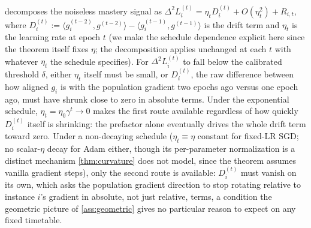 \documentclass{article}
\theoremstyle{plain}
\theoremstyle{definition}
\theoremstyle{remark}
\begin{document}
 decomposes the noiseless mastery signal as $\Delta^2 L_i^{(t)} = \eta_t D_i^{(t)} + O(\eta_t^2) + R_{i,t}$, where $D_i^{(t)} := \langle g_i^{(t-2)},g^{(t-2)}\rangle - \langle g_i^{(t-1)},g^{(t-1)}\rangle$ is the drift term and $\eta_t$ is the learning rate at epoch $t$ (we make the schedule dependence explicit here since the theorem itself fixes $\eta$; the decomposition applies unchanged at each $t$ with whatever $\eta_t$ the schedule specifies). For $\Delta^2 L_i^{(t)}$ to fall below the calibrated threshold $\delta$, either $\eta_t$ itself must be small, or $D_i^{(t)}$, the raw difference between how aligned $g_i$ is with the population gradient two epochs ago versus one epoch ago, must have shrunk close to zero in absolute terms. Under the exponential schedule, $\eta_t=\eta_0\gamma^t\to0$ makes the first route available regardless of how quickly $D_i^{(t)}$ itself is shrinking: the prefactor alone eventually drives the whole drift term toward zero. Under a non-decaying schedule ($\eta_t\equiv\eta$ constant for fixed-LR SGD; no scalar-$\eta$ decay for Adam either, though its per-parameter normalization is a distinct mechanism \cref{thm:curvature} does not model, since the theorem assumes vanilla gradient steps), only the second route is available: $D_i^{(t)}$ must vanish on its own, which asks the population gradient direction to stop rotating relative to instance $i$'s gradient in absolute, not just relative, terms, a condition the geometric picture of \cref{ass:geometric} gives no particular reason to expect on any fixed timetable.
\end{document}
